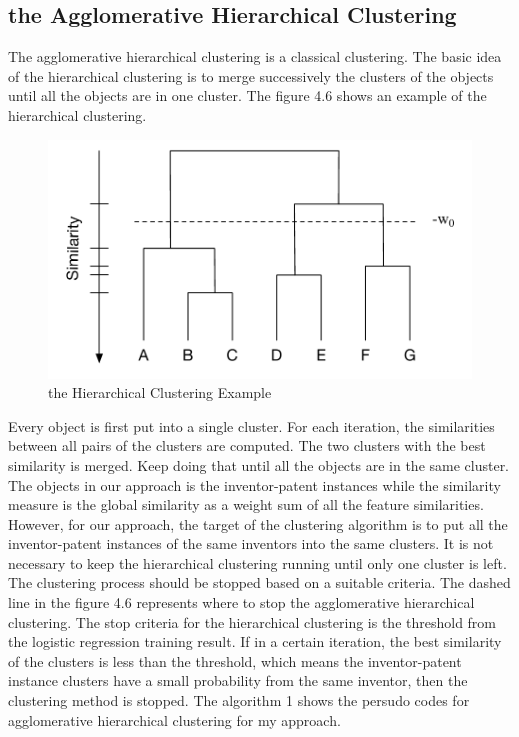 \subsection{the Agglomerative Hierarchical Clustering}
The agglomerative hierarchical clustering is a classical clustering. The basic idea of the hierarchical clustering is to merge successively the clusters of the objects until all the objects are in  one cluster. The figure 4.6 shows an example of the hierarchical clustering. 
\begin{figure}
\centering
\includegraphics[scale=0.5]{Hierarchical.pdf}
\caption{the Hierarchical Clustering Example}
\end{figure}
Every object is first put into a single cluster. For each iteration, the similarities between all pairs of the clusters are computed. The two clusters with the best similarity is merged. Keep doing that until all the objects are in the same cluster. The objects in our approach is the inventor-patent instances while the similarity measure is the global similarity as a weight sum of all the feature similarities. However, for our approach, the target of the clustering algorithm is to put all the inventor-patent instances of the same inventors into the same clusters. It is not necessary to keep the hierarchical clustering running until only one cluster is left. The clustering process should be stopped based on a suitable criteria. The dashed line in the figure 4.6 represents where to stop the agglomerative hierarchical clustering. The stop criteria for the hierarchical clustering is the threshold from the logistic regression training result. If in a certain iteration, the best similarity of the clusters is less than the threshold, which means the inventor-patent instance clusters have a small probability from the same inventor, then the clustering method is stopped.  The algorithm 1 shows the persudo codes for agglomerative hierarchical clustering for my approach. \newline

